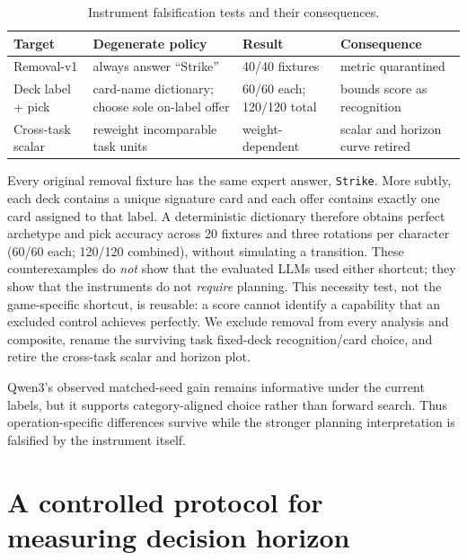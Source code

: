 \documentclass{article}
\begin{document}
\begin{table}[t]
\caption{Instrument falsification tests and their consequences.}
\label{tab:audit}
\centering
\scriptsize
\setlength{\tabcolsep}{3.6pt}
\begin{tabular}{@{}p{1.10in}p{1.65in}p{1.00in}p{1.18in}@{}}
\toprule
Target & Degenerate policy & Result & Consequence \\
\midrule
Removal-v1 & always answer ``Strike'' & 40/40 fixtures & metric quarantined \\
Deck label + pick & card-name dictionary; choose sole on-label offer & 60/60 each; 120/120 total & bounds score as recognition \\
Cross-task scalar & reweight incomparable task units & weight-dependent & scalar and horizon curve retired \\
\bottomrule
\end{tabular}
\end{table}

Every original removal fixture has the same expert answer, \texttt{Strike}. More
subtly, each deck contains a unique signature card and each offer contains exactly one
card assigned to that label. A deterministic dictionary therefore obtains perfect
archetype and pick accuracy across 20 fixtures and three rotations per character
(60/60 each; 120/120 combined), without simulating a transition. These counterexamples
do \emph{not} show that the evaluated LLMs used either shortcut; they show that the
instruments do not \emph{require} planning. This necessity test, not the game-specific
shortcut, is reusable: a score cannot identify a capability that an excluded control
achieves perfectly. We exclude removal from every analysis and composite, rename the
surviving task fixed-deck recognition/card choice, and retire the cross-task scalar and
horizon plot.

Qwen3's observed matched-seed gain remains informative under the current labels, but it
supports category-aligned choice rather than forward search. Thus operation-specific
differences survive while the stronger planning interpretation is falsified by the
instrument itself.

\section{A controlled protocol for measuring decision horizon}
\end{document}
